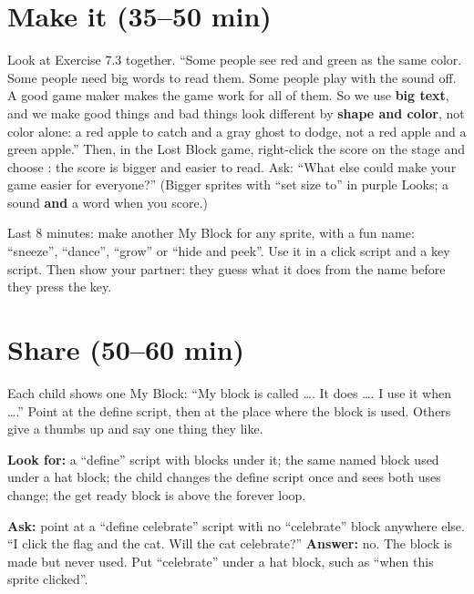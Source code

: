 \section{Make it (35--50 min)}
\begin{safety}
Look at Exercise 7.3 together. \enquote{Some people see red and green as the same color. Some people need big words to read them. Some people play with the sound off. A good game maker makes the game work for all of them. So we use \textbf{big text}, and we make good things and bad things look different by \textbf{shape and color}, not color alone: a red apple to catch and a gray ghost to dodge, not a red apple and a green apple.} Then, in the Lost Block game, right-click the score on the stage and choose : the score is bigger and easier to read. Ask: \enquote{What else could make your game easier for everyone?} (Bigger sprites with \enquote{set size to} in purple Looks; a sound \textbf{and} a word when you score.)
\end{safety}

\begin{freebuild}
Last 8 minutes: make another My Block for any sprite, with a fun name: \enquote{sneeze}, \enquote{dance}, \enquote{grow} or \enquote{hide and peek}. Use it in a click script and a key script. Then show your partner: they guess what it does from the name before they press the key.
\end{freebuild}

\section{Share (50--60 min)}
\begin{teacherscript}
Each child shows one My Block: \enquote{My block is called \ldots. It does \ldots. I use it when \ldots.} Point at the define script, then at the place where the block is used. Others give a thumbs up and say one thing they like.
\end{teacherscript}

\begin{formativecheck}
\textbf{Look for:} a \enquote{define} script with blocks under it; the same named block used under a hat block; the child changes the define script once and sees both uses change; the get ready block is above the forever loop.

\textbf{Ask:} point at a \enquote{define celebrate} script with no \enquote{celebrate} block anywhere else. \enquote{I click the flag and the cat. Will the cat celebrate?}
\textbf{Answer:} no. The block is made but never used. Put \enquote{celebrate} under a hat block, such as \enquote{when this sprite clicked}.
\end{formativecheck}

